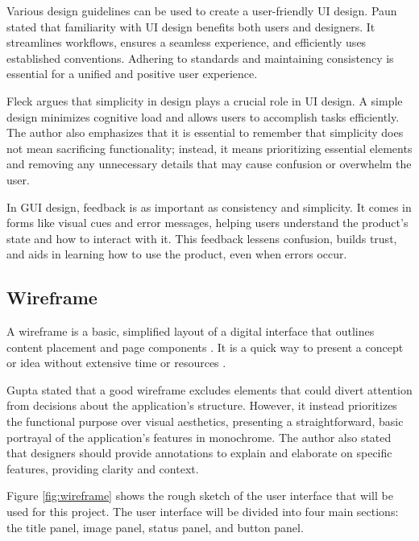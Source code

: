 Various design guidelines can be used to create a user-friendly UI design. Paun \cite{Paun_2020} stated that familiarity with UI design benefits both users and designers. It streamlines workflows, ensures a seamless experience, and efficiently uses established conventions. Adhering to standards and maintaining consistency is essential for a unified and positive user experience.

Fleck \cite{Fleck_2021} argues that simplicity in design plays a crucial role in UI design. A simple design minimizes cognitive load and allows users to accomplish tasks efficiently. The author also emphasizes that it is essential to remember that simplicity does not mean sacrificing functionality; instead, it means prioritizing essential elements and removing any unnecessary details that may cause confusion or overwhelm the user.

In GUI design, feedback is as important as consistency and simplicity. It comes in forms like visual cues and error messages, helping users understand the product's state and how to interact with it. This feedback lessens confusion, builds trust, and aids in learning how to use the product, even when errors occur. \cite{Florido_2022}

\subsection{Wireframe}
\label{subsec:wireframe}

A wireframe is a basic, simplified layout of a digital interface that outlines content placement and page components \cite{White_2023}. It is a quick way to present a concept or idea without extensive time or resources \cite{White_2023}.

Gupta \cite{Gupta_2023} stated that a good wireframe excludes elements that could divert attention from decisions about the application's structure. However, it instead prioritizes the functional purpose over visual aesthetics, presenting a straightforward, basic portrayal of the application's features in monochrome. The author also stated that designers should provide annotations to explain and elaborate on specific features, providing clarity and context.

Figure \ref{fig:wireframe} shows the rough sketch of the user interface that will be used for this project. The user interface will be divided into four main sections: the title panel, image panel, status panel, and button panel.


